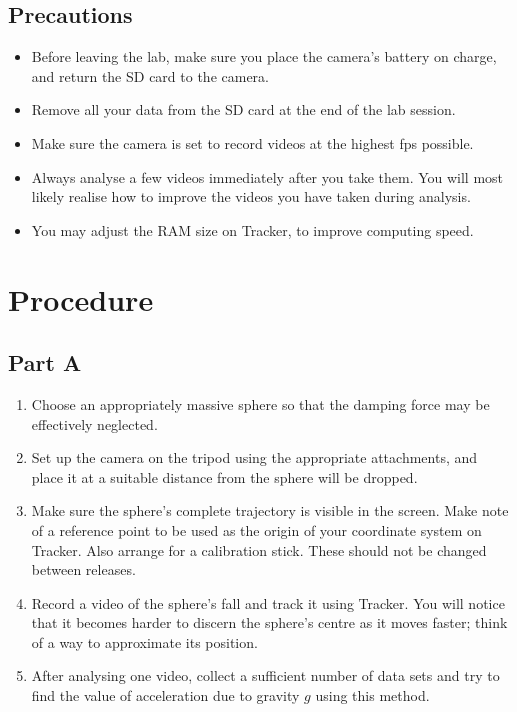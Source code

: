 \subsection*{Precautions}

\begin{itemize}
\item Before leaving the lab, make sure you place the camera's battery on charge, and return the SD card to the camera.
\item Remove all your data from the SD card at the end of the lab session.
\item Make sure the camera is set to record videos at the highest fps possible.
\item Always analyse a few videos immediately after you take them. You will most likely realise how to improve the videos you have taken during analysis.
\item You may adjust the RAM size on Tracker, to improve computing speed.
\end{itemize}



\section*{Procedure}

\subsection*{Part A} 

\begin{enumerate}
    \item Choose an appropriately massive sphere so that the damping force may be effectively neglected.
    
    \item Set up the camera on the tripod using the appropriate attachments, and place it at a suitable distance from the sphere will be dropped.
    
    \item Make sure the sphere's complete trajectory is visible in the screen. Make note of a reference point to be used as the origin of your coordinate system on Tracker. Also arrange for a calibration stick. These should not be changed between releases.
    
    \item Record a video of the sphere's fall and track it using Tracker. You will notice that it becomes harder to discern the sphere's centre as it moves faster; think of a way to approximate its position.

    \item After analysing one video, collect a sufficient number of data sets and try to find the value of acceleration due to gravity $g$ using this method.
\end{enumerate}

